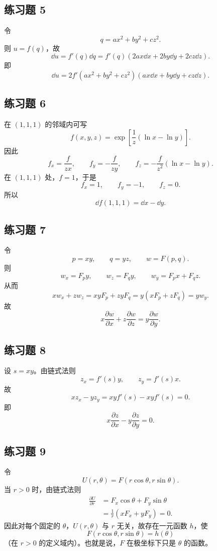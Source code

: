 \subsection*{练习题 5}
\begin{xsolution}
令
\[
  q=ax^2+by^2+cz^2.
\]
则 $u=f(q)$，故
\[
  \dd u=f'(q)\dd q
  =f'(q)(2ax\dd x+2by\dd y+2cz\dd z).
\]
即
\[
  \boxed{\dd u
  =2f'(ax^2+by^2+cz^2)
  (ax\dd x+by\dd y+cz\dd z)}.
\]
\end{xsolution}

\subsection*{练习题 6}
\begin{xsolution}
在 $(1,1,1)$ 的邻域内可写
\[
  f(x,y,z)=\exp\left[\frac1z(\ln x-\ln y)\right].
\]
因此
\[
  f_x=\frac{f}{zx},
  \qquad
  f_y=-\frac{f}{zy},
  \qquad
  f_z=-\frac{f}{z^2}(\ln x-\ln y).
\]
在 $(1,1,1)$ 处，$f=1$，于是
\[
  f_x=1,
  \qquad f_y=-1,
  \qquad f_z=0.
\]
所以
\[
  \boxed{\dd f(1,1,1)=\dd x-\dd y}.
\]
\end{xsolution}

\subsection*{练习题 7}
\begin{xsolution}
令
\[
  p=xy,
  \qquad q=yz,
  \qquad w=F(p,q).
\]
则
\[
  w_x=F_p y,
  \qquad
  w_z=F_q y,
  \qquad
  w_y=F_p x+F_q z.
\]
从而
\[
  xw_x+zw_z
  =xyF_p+zyF_q
  =y(xF_p+zF_q)
  =yw_y.
\]
故
\[
  \boxed{x\frac{\partial w}{\partial x}
  +z\frac{\partial w}{\partial z}
  =y\frac{\partial w}{\partial y}}.
\]
\end{xsolution}

\subsection*{练习题 8}
\begin{xsolution}
设 $s=xy$。由链式法则
\[
  z_x=f'(s)y,
  \qquad
  z_y=f'(s)x.
\]
故
\[
  xz_x-yz_y
  =xyf'(s)-xyf'(s)=0.
\]
即
\[
  \boxed{x\frac{\partial z}{\partial x}
  -y\frac{\partial z}{\partial y}=0}.
\]
\end{xsolution}

\subsection*{练习题 9}
\begin{xsolution}
令
\[
  U(r,\theta)=F(r\cos\theta,r\sin\theta).
\]
当 $r>0$ 时，由链式法则
\begin{align*}
  \frac{\partial U}{\partial r}
  &=F_x\cos\theta+F_y\sin\theta\\
  &=\frac1r(xF_x+yF_y)=0.
\end{align*}
因此对每个固定的 $\theta$，$U(r,\theta)$ 与 $r$ 无关，故存在一元函数 $h$，使
\[
  \boxed{F(r\cos\theta,r\sin\theta)=h(\theta)}
\]
（在 $r>0$ 的定义域内）。也就是说，$F$ 在极坐标下只是 $\theta$ 的函数。
\end{xsolution}

